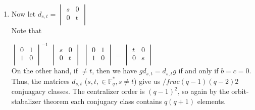 \documentclass[12pt,twoside]{reedthesis}
\begin{document}
\begin{enumerate}
\item
Now let $d_{s,t} =
\begin{vmatrix}
s&0\\
0&t\\
\end{vmatrix}$\\

Note that

$
\begin{vmatrix}
0&1\\
1&0\\
\end{vmatrix}^{-1}
$
$
\begin{vmatrix}
s&0\\
0&t\\
\end{vmatrix}
$
$
\begin{vmatrix}
0&1\\
1&0\\
\end{vmatrix}
$
=
$
\begin{vmatrix}
t&0\\
0&s\\
\end{vmatrix}
$\\

On the other hand, if $\neq{t}$, then we have $gd_{s,t} = d_{s,t}g$ if and only if $b=c=0.$  Thus, the matrices $d_{s,t}$ ($s,t, \in{\mathbb{F}^*_q}, s\neq{t}$) 
give us $/frac{(q-1)(q-2)}{2}$ conjuagacy classes.  The centralizer order is $(q-1)^2$, so again by the orbit-stabalizer theorem each conjugacy class contains $q(q+1)$
elements. 





\end{enumerate}
\end{document}
